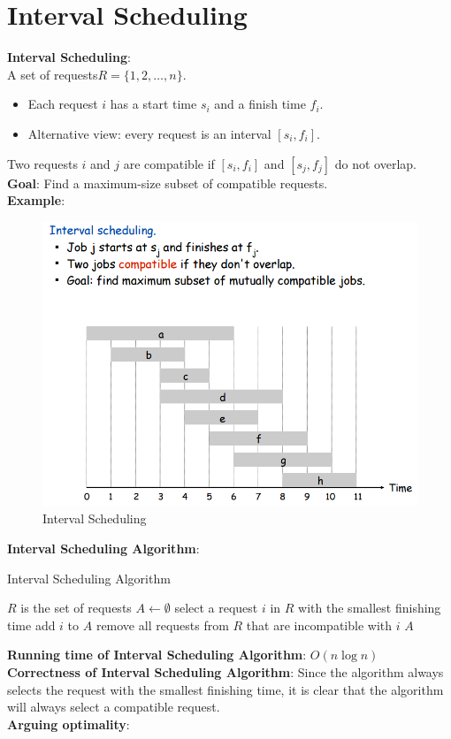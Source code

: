 \documentclass[onecolumn]{report}
\begin{document}
\section{Interval Scheduling}
\textbf{Interval Scheduling}:\\
A set of requests$R=\{1,2,\dots,n\}$.
\begin{itemize}
    \item Each request $i$ has a start time $s_i$ and a finish time $f_i$.
    \item Alternative view: every request is an interval $[s_i,f_i]$.
\end{itemize}
Two requests $i$ and $j$ are compatible if $[s_i,f_i]$ and $[s_j,f_j]$ do not overlap.\\
\textbf{Goal}: Find a maximum-size subset of compatible requests.\\
\textbf{Example}:\\
\begin{figure}[H]
    \centering
    \includegraphics[width=0.65\linewidth]{figures/scheduling.png}
    \caption{Interval Scheduling}
    \label{fig:my_label}
\end{figure}
\noindent
\textbf{Interval Scheduling Algorithm}:
\begin{algorithm}[H]
\caption{Interval Scheduling Algorithm}
\begin{algorithmic}[1]
\State $R$ is the set of requests
\State $A \gets \emptyset$
\State select a request $i$ in $R$ with the smallest finishing time
\State add $i$ to $A$
\State remove all requests from $R$ that are incompatible with $i$
\EndWhile
\State \Return $A$
\EndProcedure
\end{algorithmic}
\end{algorithm}
\noindent
\textbf{Running time of Interval Scheduling Algorithm}: $O(n\log n)$\\
\textbf{Correctness of Interval Scheduling Algorithm}:
Since the algorithm always selects the request with the smallest finishing time, it is clear that the algorithm will always select a compatible request.\\
\textbf{Arguing optimality}:\\
\end{document}
